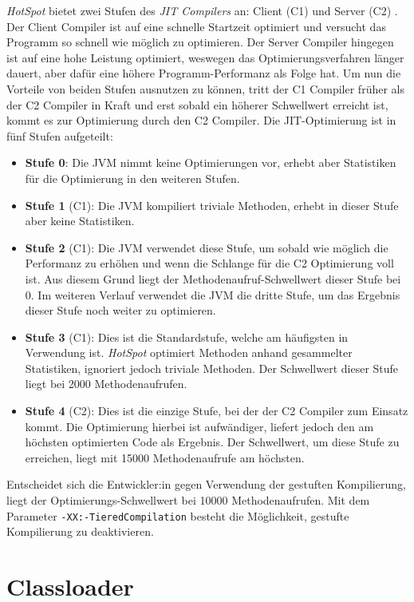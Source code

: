 \textit{HotSpot} bietet zwei Stufen des \textit{JIT Compilers} an: Client (C1) und Server (C2) \parencite{jvmhotspot}. Der Client Compiler ist auf eine schnelle Startzeit optimiert und versucht das Programm so schnell wie möglich zu optimieren. Der Server Compiler hingegen ist auf eine hohe Leistung optimiert, weswegen das Optimierungsverfahren länger dauert, aber dafür eine höhere Programm-Performanz als Folge hat. Um nun die Vorteile von beiden Stufen ausnutzen zu können, tritt der C1 Compiler früher als der C2 Compiler in Kraft und erst sobald ein höherer Schwellwert erreicht ist, kommt es zur Optimierung durch den C2 Compiler. Die JIT-Optimierung ist in fünf Stufen aufgeteilt:
\begin{itemize}
    \item \textbf{Stufe 0}: Die JVM nimmt keine Optimierungen vor, erhebt aber Statistiken für die Optimierung in den weiteren Stufen.
    \item \textbf{Stufe 1} (C1): Die JVM kompiliert triviale Methoden, erhebt in dieser Stufe aber keine Statistiken.
    \item \textbf{Stufe 2} (C1): Die JVM verwendet diese Stufe, um sobald wie möglich die Performanz zu erhöhen und wenn die Schlange für die C2 Optimierung voll ist. Aus diesem Grund liegt der Methodenaufruf-Schwellwert dieser Stufe bei 0. Im weiteren Verlauf verwendet die JVM die dritte Stufe, um das Ergebnis dieser Stufe noch weiter zu optimieren.
    \item \textbf{Stufe 3} (C1): Dies ist die Standardstufe, welche am häufigsten in Verwendung ist. \textit{HotSpot} optimiert Methoden anhand gesammelter Statistiken, ignoriert jedoch triviale Methoden. Der Schwellwert dieser Stufe liegt bei 2000 Methodenaufrufen.
    \item \textbf{Stufe 4} (C2): Dies ist die einzige Stufe, bei der der C2 Compiler zum Einsatz kommt. Die Optimierung hierbei ist aufwändiger, liefert jedoch den am höchsten optimierten Code als Ergebnis. Der Schwellwert, um diese Stufe zu erreichen, liegt mit 15000 Methodenaufrufe am höchsten.
\end{itemize}

Entscheidet sich die Entwickler:in gegen Verwendung der gestuften Kompilierung, liegt der Optimierungs-Schwellwert bei 10000 Methodenaufrufen. Mit dem Parameter \texttt{-XX:-TieredCompilation} besteht die Möglichkeit, gestufte Kompilierung zu deaktivieren.

\section{Classloader}

